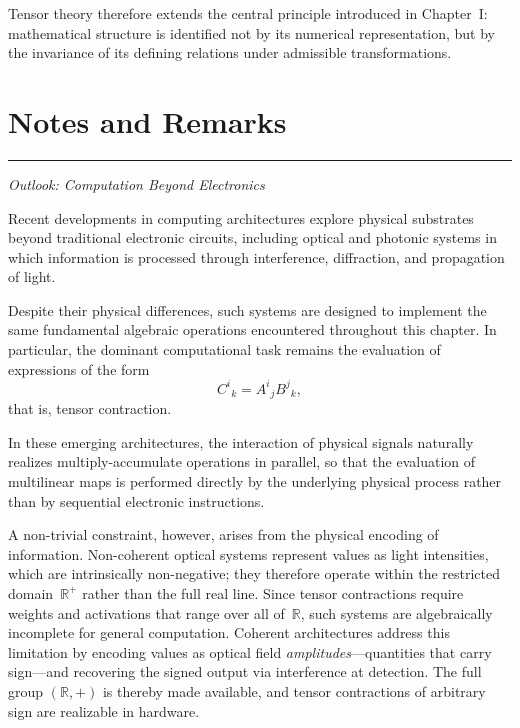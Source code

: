 \medskip

Tensor theory therefore extends the central principle introduced in Chapter~I:
mathematical structure is identified not by its numerical representation,
but by the invariance of its defining relations under admissible
transformations.


\section*{Notes and Remarks}

\bigskip
\hrule
\medskip

\textit{Outlook: Computation Beyond Electronics \cite{Xu}}

\medskip

Recent developments in computing architectures explore physical substrates
beyond traditional electronic circuits, including optical and photonic systems
in which information is processed through interference, diffraction, and
propagation of light.

\medskip

Despite their physical differences, such systems are designed to implement the
same fundamental algebraic operations encountered throughout this chapter.
In particular, the dominant computational task remains the evaluation of
expressions of the form
\[
C^{i}{}_{k} = A^{i}{}_{j} B^{j}{}_{k},
\]
that is, tensor contraction.

\medskip

In these emerging architectures, the interaction of physical signals naturally
realizes multiply-accumulate operations in parallel, so that the evaluation of
multilinear maps is performed directly by the underlying physical process rather
than by sequential electronic instructions.

\medskip

A non-trivial constraint, however, arises from the physical encoding of
information.
Non-coherent optical systems represent values as light intensities, which are
intrinsically non-negative; they therefore operate within the restricted
domain~$\mathbb{R}^+$ rather than the full real line.
Since tensor contractions require weights and activations that range over all
of~$\mathbb{R}$, such systems are algebraically incomplete for general
computation.
Coherent architectures address this limitation by encoding values as optical
field \emph{amplitudes}---quantities that carry sign---and recovering the
signed output via interference at detection.
The full group $(\mathbb{R},+)$ is thereby made available, and tensor
contractions of arbitrary sign are realizable in hardware.

